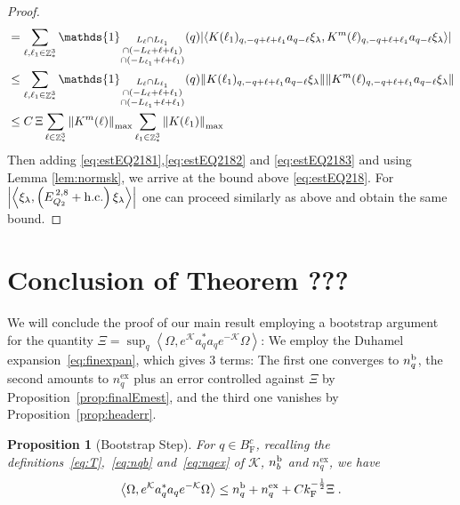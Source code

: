 \documentclass[12pt,a4paper]{article}
\numberwithin{equation}{section}
\newcommand{\cK}{\mathcal{K}}
\newcommand{\1}{\mathbb{I}}
\renewcommand{\b}{\textnormal{b}}
\newcommand{\ex}{\mathrm{ex}}
\newcommand{\F}{\mathrm{F}}
\DeclareMathOperator{\Z}{\mathbb{Z}}
\newcommand{\half}{\frac{1}{2}}
\newcommand{\eva}[1]{\left\langle #1 \right\rangle}
\theoremstyle{plain}
\newtheorem{proposition}[theorem]{Proposition}
\theoremstyle{definition}
\theoremstyle{remark}
\theoremstyle{plain}
\theoremstyle{definition}
\theoremstyle{remark}
\begin{document}
\begin{proof}
\begin{align}
	&= \sum\limits_{\ell, \ell_1\in \Z^3_*} \mathds{1}_{\substack{L_{\ell}\cap L_{\ell_1}\\\cap (-L_{\ell}+\ell+\ell_1) \\ \cap (-L_{\ell_1}+\ell+\ell_1)}} (q) \abs{\eva{K(\ell_1)_{q,-q+\ell+\ell_1} a_{q-\ell} \xi_\lambda, K^m(\ell)_{q,-q+\ell+\ell_1} a_{q-\ell}\xi_\lambda }}\nonumber\\
	&\leq \sum\limits_{\ell, \ell_1\in \Z^3_*} \mathds{1}_{\substack{L_{\ell}\cap L_{\ell_1}\\\cap (-L_{\ell}+\ell+\ell_1) \\ \cap (-L_{\ell_1}+\ell+\ell_1)}} (q) \norm{K(\ell_1)_{q,-q+\ell+\ell_1} a_{q-\ell} \xi_\lambda}\norm{ K^m(\ell)_{q,-q+\ell+\ell_1} a_{q-\ell}\xi_\lambda }\nonumber\\
	&\leq C\,\Xi \sum\limits_{\ell \in \Z^3_*} \norm{K^m(\ell)}_{\max} \sum\limits_{\ell_1 \in \Z^3_*} \norm{K(\ell_1)}_{\max}  \label{eq:estEQ2183}
\end{align} 
Then adding \eqref{eq:estEQ2181},\eqref{eq:estEQ2182} and \eqref{eq:estEQ2183} and using Lemma \ref{lem:normsk}, we arrive at the bound above \eqref{eq:estEQ218}. For $\abs{\eva{\xi_\lambda,\left(E^{\,2,8}_{Q_2}+\mathrm{h.c.}\right) \xi_\lambda }}$ one can proceed similarly as above and obtain the same bound.
\end{proof}




\section{Conclusion of Theorem ???}

We will conclude the proof of our main result employing a bootstrap argument for the quantity $ \Xi = \sup_q \eva{\Omega, e^{\cK} a_q^* a_q e^{-\cK} \Omega}  $: We employ the Duhamel expansion~\eqref{eq:finexpan}, which gives 3 terms: The first one converges to $ n_q^{\b} $, the second amounts to $ n_q^{\ex} $ plus an error controlled against $ \Xi $ by Proposition~\ref{prop:finalEmest}, and the third one vanishes by Proposition~\ref{prop:headerr}.

\begin{proposition}[Bootstrap Step] \label{prop:bootstrap}
For $q \in B^c_{\F}$, recalling the definitions~\eqref{eq:T},~\eqref{eq:nqb} and~\eqref{eq:nqex} of $ \cK $, $ n_b^{\b} $ and $ n_q^{\ex} $, we have
\begin{equation} \label{eq:bootstrap}
	\eva{\Omega, e^{\cK} a_q^* a_q e^{-\cK} \Omega} 
	\le n_q^{\b} + n_q^{\ex} + C k_{\F}^{-\half} \Xi \;.
\end{equation} 
\end{proposition} 
\end{document}
